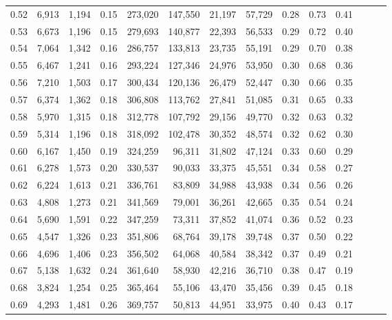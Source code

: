 \begin{tabular}{rrrrrrrrrrrrrr}
0.52 &   6,913 &  1,194 &  0.15 &  273,020 &  147,550 &  21,197 &  57,729 &  0.28 &  0.73 &      0.41 \\
0.53 &   6,673 &  1,196 &  0.15 &  279,693 &  140,877 &  22,393 &  56,533 &  0.29 &  0.72 &      0.40 \\
0.54 &   7,064 &  1,342 &  0.16 &  286,757 &  133,813 &  23,735 &  55,191 &  0.29 &  0.70 &      0.38 \\
0.55 &   6,467 &  1,241 &  0.16 &  293,224 &  127,346 &  24,976 &  53,950 &  0.30 &  0.68 &      0.36 \\
0.56 &   7,210 &  1,503 &  0.17 &  300,434 &  120,136 &  26,479 &  52,447 &  0.30 &  0.66 &      0.35 \\
0.57 &   6,374 &  1,362 &  0.18 &  306,808 &  113,762 &  27,841 &  51,085 &  0.31 &  0.65 &      0.33 \\
0.58 &   5,970 &  1,315 &  0.18 &  312,778 &  107,792 &  29,156 &  49,770 &  0.32 &  0.63 &      0.32 \\
0.59 &   5,314 &  1,196 &  0.18 &  318,092 &  102,478 &  30,352 &  48,574 &  0.32 &  0.62 &      0.30 \\
0.60 &   6,167 &  1,450 &  0.19 &  324,259 &   96,311 &  31,802 &  47,124 &  0.33 &  0.60 &      0.29 \\
0.61 &   6,278 &  1,573 &  0.20 &  330,537 &   90,033 &  33,375 &  45,551 &  0.34 &  0.58 &      0.27 \\
0.62 &   6,224 &  1,613 &  0.21 &  336,761 &   83,809 &  34,988 &  43,938 &  0.34 &  0.56 &      0.26 \\
0.63 &   4,808 &  1,273 &  0.21 &  341,569 &   79,001 &  36,261 &  42,665 &  0.35 &  0.54 &      0.24 \\
0.64 &   5,690 &  1,591 &  0.22 &  347,259 &   73,311 &  37,852 &  41,074 &  0.36 &  0.52 &      0.23 \\
0.65 &   4,547 &  1,326 &  0.23 &  351,806 &   68,764 &  39,178 &  39,748 &  0.37 &  0.50 &      0.22 \\
0.66 &   4,696 &  1,406 &  0.23 &  356,502 &   64,068 &  40,584 &  38,342 &  0.37 &  0.49 &      0.21 \\
0.67 &   5,138 &  1,632 &  0.24 &  361,640 &   58,930 &  42,216 &  36,710 &  0.38 &  0.47 &      0.19 \\
0.68 &   3,824 &  1,254 &  0.25 &  365,464 &   55,106 &  43,470 &  35,456 &  0.39 &  0.45 &      0.18 \\
0.69 &   4,293 &  1,481 &  0.26 &  369,757 &   50,813 &  44,951 &  33,975 &  0.40 &  0.43 &      0.17 \\

\end{tabular}
